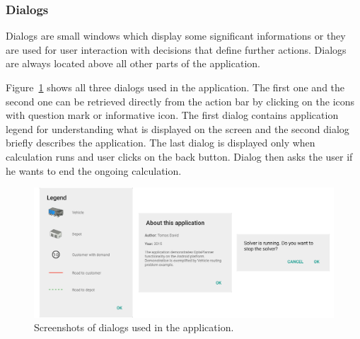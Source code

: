 \subsubsection{Dialogs}
Dialogs are small windows which display some significant informations or they are used for user interaction with
decisions that define further actions. Dialogs are always located above all other parts of the application.

Figure~\ref{DialogsFigure} shows all three dialogs used in the application. The first one and the second one can be
retrieved directly from the action bar by clicking on the icons with question mark or informative icon. The first dialog
contains application legend for understanding what is displayed on the screen and the second dialog briefly describes
the application. The last dialog is displayed only when calculation runs and user clicks on the back button. Dialog then
asks the user if he wants to end the ongoing calculation.
\\
\begin{figure}[h!]
    \centering
    \includegraphics[scale=0.15]{fig/dialogs.png}
    \caption{Screenshots of dialogs used in the application.}
    \label{DialogsFigure}
\end{figure}
